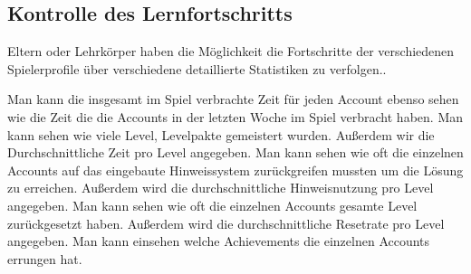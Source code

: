 \subsection{Kontrolle des Lernfortschritts}

\begin{requirements}
	Eltern oder Lehrkörper haben die Möglichkeit die Fortschritte der verschiedenen Spielerprofile über verschiedene detaillierte Statistiken zu verfolgen..
	\begin{requirements}
		 Man kann die insgesamt im Spiel verbrachte Zeit für jeden Account ebenso sehen wie die Zeit die die Accounts in der letzten Woche im Spiel verbracht haben. 
		 Man kann sehen wie viele Level, Levelpakte gemeistert wurden. Außerdem wir die Durchschnittliche Zeit pro Level angegeben.
		 Man kann sehen wie oft die einzelnen Accounts auf das eingebaute Hinweissystem zurückgreifen mussten um die Lösung zu erreichen. Außerdem wird die durchschnittliche Hinweisnutzung pro Level angegeben.
		 Man kann sehen wie oft die einzelnen Accounts gesamte Level zurückgesetzt haben. Außerdem wird die durchschnittliche Resetrate pro Level angegeben.
		 Man kann einsehen welche Achievements die einzelnen Accounts errungen hat.
	\end{requirements}
\end{requirements}


